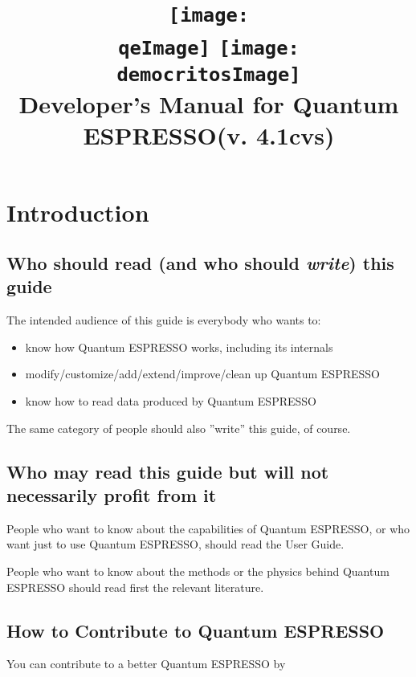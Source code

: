 \documentclass[12pt,a4paper]{article}
\def\version{4.1cvs}
\def\qe{{\sc Quantum ESPRESSO}}
\def\qeImage{quantum_espresso.pdf}
\def\democritosImage{democritos.pdf}
\def\qeImage{quantum_espresso.png}
\def\democritosImage{democritos.png}
\begin{document}
 
\author{}
\date{}
\title{
  \texttt{[image: \\qeImage]} \hskip 2cm
  \texttt{[image: \\democritosImage]}\\
  \vskip 1cm
  \Huge Developer's Manual for \qe (v. \version) \smallskip
}
\maketitle

\tableofcontents

\section{Introduction}
\subsection{Who should read (and who should {\em write}) this guide}

The intended audience of this guide is everybody who wants to:
\begin{itemize}
\item know how Quantum ESPRESSO works, including its internals
\item modify/customize/add/extend/improve/clean up Quantum ESPRESSO
\item know how to read data produced by Quantum ESPRESSO
\end{itemize}
The same category of people should also ''write'' this guide, of course.

\subsection{Who may read this guide but will not necessarily profit from it}

People who want to know about the capabilities of Quantum ESPRESSO,
or who want just to use Quantum ESPRESSO, should read the 
User Guide.

People who want to know about the methods or the physics
behind Quantum ESPRESSO should read first the relevant  
literature.

\subsection{How to Contribute to Quantum ESPRESSO}

You can contribute to a better Quantum ESPRESSO by
\end{document}
